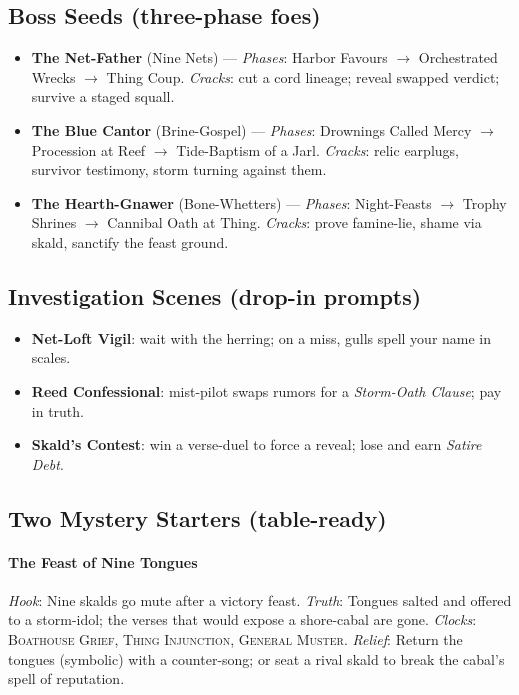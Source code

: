 \subsection*{Boss Seeds (three-phase foes)}
\begin{itemize}
  \item \textbf{The Net-Father} (Nine Nets) — \emph{Phases}: Harbor Favours $\rightarrow$ Orchestrated Wrecks $\rightarrow$ Thing Coup. \emph{Cracks}: cut a cord lineage; reveal swapped verdict; survive a staged squall.
  \item \textbf{The Blue Cantor} (Brine-Gospel) — \emph{Phases}: Drownings Called Mercy $\rightarrow$ Procession at Reef $\rightarrow$ Tide-Baptism of a Jarl. \emph{Cracks}: relic earplugs, survivor testimony, storm turning against them.
  \item \textbf{The Hearth-Gnawer} (Bone-Whetters) — \emph{Phases}: Night-Feasts $\rightarrow$ Trophy Shrines $\rightarrow$ Cannibal Oath at Thing. \emph{Cracks}: prove famine-lie, shame via skald, sanctify the feast ground.
\end{itemize}

\subsection*{Investigation Scenes (drop-in prompts)}
\begin{itemize}
  \item \textbf{Net-Loft Vigil}: wait with the herring; on a miss, gulls spell your name in scales.
  \item \textbf{Reed Confessional}: mist-pilot swaps rumors for a \emph{Storm-Oath Clause}; pay in truth.
  \item \textbf{Skald’s Contest}: win a verse-duel to force a reveal; lose and earn \emph{Satire Debt}.
\end{itemize}

\subsection*{Two Mystery Starters (table-ready)}
\paragraph{The Feast of Nine Tongues}
\emph{Hook}: Nine skalds go mute after a victory feast. \emph{Truth}: Tongues salted and offered to a storm-idol; the verses that would expose a shore-cabal are gone. \emph{Clocks}: \textsc{Boathouse Grief}, \textsc{Thing Injunction}, \textsc{General Muster}. \emph{Relief}: Return the tongues (symbolic) with a counter-song; or seat a rival skald to break the cabal’s spell of reputation.

